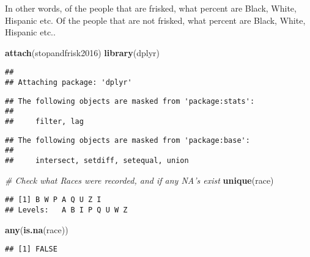 \documentclass[]{article}
\newenvironment{Shaded}{\begin{snugshade}}{\end{snugshade}}
\newcommand{\CommentTok}[1]{\textcolor[rgb]{0.56,0.35,0.01}{\textit{#1}}}
\newcommand{\KeywordTok}[1]{\textcolor[rgb]{0.13,0.29,0.53}{\textbf{#1}}}
\newcommand{\NormalTok}[1]{#1}
\begin{document}
In other words, of the people that are frisked, what percent are Black,
White, Hispanic etc. Of the people that are not frisked, what percent
are Black, White, Hispanic etc..

\begin{Shaded}
\begin{Highlighting}[]
\KeywordTok{attach}\NormalTok{(stopandfrisk2016)}
\KeywordTok{library}\NormalTok{(dplyr)}
\end{Highlighting}
\end{Shaded}

\begin{verbatim}
## 
## Attaching package: 'dplyr'
\end{verbatim}

\begin{verbatim}
## The following objects are masked from 'package:stats':
## 
##     filter, lag
\end{verbatim}

\begin{verbatim}
## The following objects are masked from 'package:base':
## 
##     intersect, setdiff, setequal, union
\end{verbatim}

\begin{Shaded}
\begin{Highlighting}[]
\CommentTok{# Check what Races were recorded, and if any NA's exist }
\KeywordTok{unique}\NormalTok{(race)}
\end{Highlighting}
\end{Shaded}

\begin{verbatim}
## [1] B W P A Q U Z I  
## Levels:   A B I P Q U W Z
\end{verbatim}

\begin{Shaded}
\begin{Highlighting}[]
\KeywordTok{any}\NormalTok{(}\KeywordTok{is.na}\NormalTok{(race))}
\end{Highlighting}
\end{Shaded}

\begin{verbatim}
## [1] FALSE
\end{verbatim}
\end{document}
